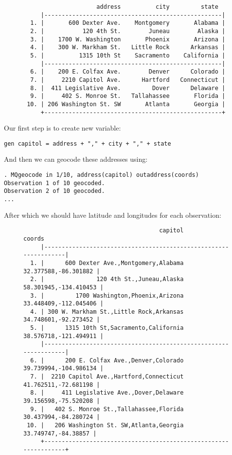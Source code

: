 \documentclass[12pt]{article}
\begin{document}
\begin{figure}[ht]
\begin{center}
\begin{verbatim}
                     address          city         state 
     |---------------------------------------------------|
  1. |       600 Dexter Ave.    Montgomery       Alabama |
  2. |           120 4th St.        Juneau        Alaska |
  3. |    1700 W. Washington       Phoenix       Arizona |
  4. |    300 W. Markham St.   Little Rock      Arkansas |
  5. |          1315 10th St    Sacramento    California |
     |---------------------------------------------------|
  6. |    200 E. Colfax Ave.        Denver      Colorado |
  7. |     2210 Capitol Ave.      Hartford   Connecticut |
  8. |  411 Legislative Ave.         Dover      Delaware |
  9. |     402 S. Monroe St.   Tallahassee       Florida |
 10. | 206 Washington St. SW       Atlanta       Georgia |
     +---------------------------------------------------+
\end{verbatim}
\end{center}
\end{figure}

Our first step is to create new variable:
\begin{center}
\verb|gen capitol = address + "," + city + "," + state|
\end{center}

And then we can geocode these addresses using: 
\begin{verbatim}
. MQgeocode in 1/10, address(capitol) outaddress(coords)
Observation 1 of 10 geocoded.
Observation 2 of 10 geocoded.
...
\end{verbatim}
After which we should have latitude and longitudes for each observation:
\begin{figure}[ht]
\begin{verbatim}
                                       capitol                  coords 
     |-----------------------------------------------------------------|
  1. |      600 Dexter Ave.,Montgomery,Alabama    32.377588,-86.301882 |
  2. |               120 4th St.,Juneau,Alaska   58.301945,-134.410453 |
  3. |         1700 Washington,Phoenix,Arizona   33.448409,-112.045406 |
  4. | 300 W. Markham St.,Little Rock,Arkansas    34.748601,-92.273452 |
  5. |      1315 10th St,Sacramento,California   38.576718,-121.494911 |
     |-----------------------------------------------------------------|
  6. |      200 E. Colfax Ave.,Denver,Colorado   39.739994,-104.986134 |
  7. |  2210 Capitol Ave.,Hartford,Connecticut    41.762511,-72.681198 |
  8. |     411 Legislative Ave.,Dover,Delaware    39.156598,-75.520208 |
  9. |   402 S. Monroe St.,Tallahassee,Florida    30.437994,-84.280724 |
 10. |   206 Washington St. SW,Atlanta,Georgia     33.749747,-84.38857 |
     +-----------------------------------------------------------------+
\end{verbatim}
\end{figure}
\end{document}
